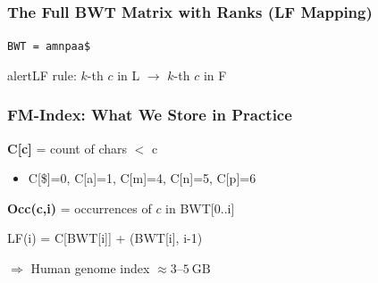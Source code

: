 \documentclass[
11pt, %
aspectratio=169, %
]{beamer}
\begin{document}

\begin{frame}
\frametitle{The Full BWT Matrix with Ranks (LF Mapping)}

\texttt{BWT = amnpaa\$}

\bigskip
{}

\bigskip
alert{LF rule:} $k$-th $c$ in L $\to$ $k$-th $c$ in F
\end{frame}


\begin{frame}
\frametitle{FM-Index: What We Store in Practice}
\begin{minipage}{0.58\linewidth}
\textbf{C[c]} = count of chars $<$ c
\begin{itemize}
\item C[\$]=0, C[a]=1, C[m]=4, C[n]=5, C[p]=6
\end{itemize}
\end{minipage}
\begin{minipage}{0.4\linewidth}
\textbf{Occ(c,i)} = occurrences of $c$ in BWT[0..i]
\end{minipage}

\bigskip
\alert{LF(i) = C[BWT[i]] + (BWT[i], i-1)}

$\Rightarrow$ Human genome index \(\approx 3\text{--}5\ \mathrm{GB}\)
\end{frame}




\end{document}
